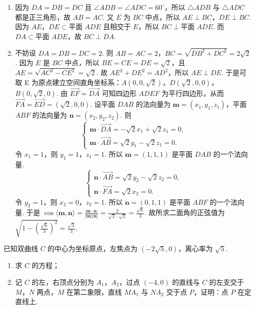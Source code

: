 \begin{solution}
\begin{enumerate}
\item 因为 \(DA=DB=DC\) 且 \(\angle ADB=\angle ADC=60^\circ\)，所以 \(\triangle ADB\) 与 \(\triangle ADC\) 都是正三角形，故 \(AB=AC\).
又 \(E\) 为 \(BC\) 中点，所以 \(AE\perp BC\)，\(DE\perp BC\). 因为 \(AE\)，\(DE\subset \text{平面 }ADE\) 且相交于 \(E\)，所以 \(BC\perp \text{平面 }ADE\). 而 \(DA\subset \text{平面 }ADE\)，故 \(BC\perp DA\).

\item 不妨设 \(DA=DB=DC=2\). 则 \(AB=AC=2\)，\(BC=\sqrt{DB^2+DC^2}=2\sqrt2\).
因为 \(E\) 是 \(BC\) 中点，所以 \(BE=CE=DE=\sqrt2\)，且 \(AE=\sqrt{AC^2-CE^2}=\sqrt2\).
故 \(AE^2+DE^2=AD^2\)，所以 \(AE\perp DE\). 于是可取 E 为原点建立空间直角坐标系：\(A(0,0,\sqrt2)\)，\(D(\sqrt2,0,0)\)，\(B(0,\sqrt2,0)\).
由 \(\overrightarrow{EF}=\overrightarrow{DA}\) 可知四边形 \(ADEF\) 为平行四边形，从而 \(\overrightarrow{FA}=\overrightarrow{ED}=(\sqrt2,0,0)\).
设平面 \(DAB\) 的法向量为 \(\mathbf m=(x_1,y_1,z_1)\)，平面 \(ABF\) 的法向量为 \(\mathbf n=(x_2,y_2,z_2)\). 则
\[
\begin{cases}
\mathbf m\cdot \overrightarrow{DA}=-\sqrt2 x_1+\sqrt2 z_1=0,\\
\mathbf m\cdot \overrightarrow{AB}=\sqrt2 y_1-\sqrt2 z_1=0.
\end{cases}
\]
令 \(x_1=1\)，则 \(y_1=1\)，\(z_1=1\).
所以 \(\mathbf m=(1,1,1)\) 是平面 \(DAB\) 的一个法向量.
\[
\begin{cases}
\mathbf n\cdot \overrightarrow{AB}=\sqrt2 y_2-\sqrt2 z_2=0,\\
\mathbf n\cdot \overrightarrow{FA}=\sqrt2 x_2=0.
\end{cases}
\]
令 \(y_2=1\)，则 \(x_2=0\)，\(z_2=1\).
所以 \(\mathbf n=(0,1,1)\) 是平面 \(ABF\) 的一个法向量.
于是 \(\cos\langle \mathbf m,\mathbf n\rangle=\frac{\mathbf m\cdot \mathbf n}{|\mathbf m||\mathbf n|}=\frac{2}{\sqrt3\cdot \sqrt2}=\frac{\sqrt6}{3}\). 故所求二面角的正弦值为 \(\sqrt{1-\left(\frac{\sqrt6}{3}\right)^2}=\frac{\sqrt3}{3}\).

\end{enumerate}
\end{solution}

\begin{problem}
已知双曲线 \(C\) 的中心为坐标原点，左焦点为 \((-2\sqrt5,0)\)，离心率为 \(\sqrt5\).

\begin{enumerate}
\item 求 \(C\) 的方程；
\item 记 \(C\) 的左，右顶点分别为 \(A_1\)，\(A_2\)，过点 \((-4,0)\) 的直线与 \(C\) 的左支交于 \(M\)，\(N\) 两点，\(M\) 在第二象限，直线 \(MA_1\) 与 \(NA_2\) 交于点 \(P\)，证明：点 \(P\) 在定直线上.
\end{enumerate}
\end{problem}

